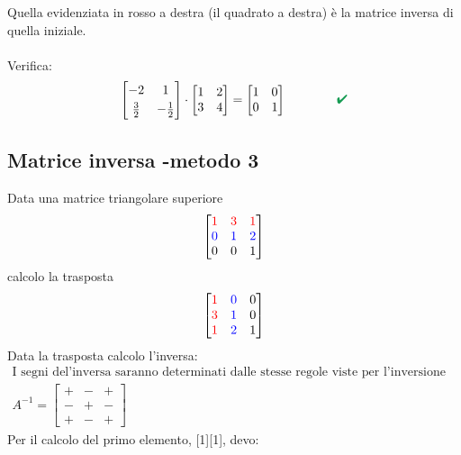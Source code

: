 \documentclass[italian]{article}
\renewcommand{\checkmark}{\textcolor{ForestGreen}{\text{$\qquad$\ding{52}}}}
\begin{document}
Quella evidenziata in rosso a destra (il quadrato a destra) è la matrice inversa di quella iniziale.\\\\
Verifica:
\[
	\begin{bmatrix}
		-2 & 1 \\[1mm]
		\frac{3}{2} & -\frac{1}{2}
	\end{bmatrix}
	\cdot
	\begin{bmatrix}
		1 & 2 \\
		3 & 4
	\end{bmatrix}
	=
	\begin{bmatrix}
		1 & 0 \\
		0 & 1
	\end{bmatrix}
	\qquad \checkmark
\]

\subsection{Matrice inversa -metodo 3}
Data una matrice triangolare superiore
\[
	\begin{bmatrix}
		\textcolor{red}{1} & \textcolor{red}{3} & \textcolor{red}{1} \\
		\textcolor{blue}{0} & \textcolor{blue}{1} & \textcolor{blue}{2} \\
		0 & 0 & 1
	\end{bmatrix}
\]
calcolo la trasposta
\[
	\begin{bmatrix}
		\textcolor{red}{1} & \textcolor{blue}{0} & 0 \\
		\textcolor{red}{3} & \textcolor{blue}{1} & 0 \\
		\textcolor{red}{1} & \textcolor{blue}{2} & 1
	\end{bmatrix}
\]
Data la trasposta calcolo l'inversa:
\begin{gather*}
	\text{I segni del'inversa saranno determinati dalle stesse regole viste per l'inversione della diagonale}\\
	A^{-1} = 
	\begin{bmatrix}
		+ & - & + \\
		- & + & - \\
		+ & - & +
	\end{bmatrix}
\end{gather*}
Per il calcolo del primo elemento, [1][1], devo:
\end{document}
